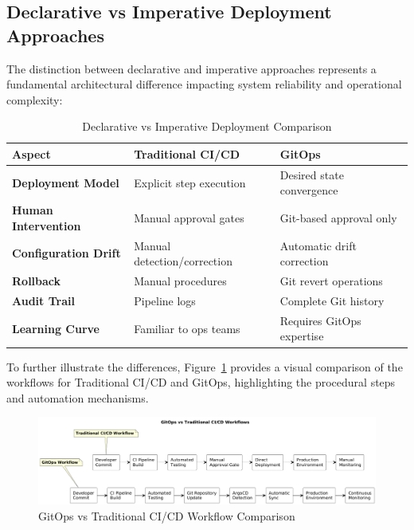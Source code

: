 \subsection{Declarative vs Imperative Deployment Approaches}

The distinction between declarative and imperative approaches represents a fundamental architectural difference impacting system reliability and operational complexity:

\begin{table}[h]
\centering
\caption{Declarative vs Imperative Deployment Comparison}
\label{tab:declarative_imperative_comparison}
\renewcommand{\arraystretch}{1.4}
\scriptsize
\begin{tabular}{|p{2.5cm}|p{4.5cm}|p{4.5cm}|}
\hline
\textbf{Aspect} & \textbf{Traditional CI/CD} & \textbf{GitOps} \\
\hline
\textbf{Deployment Model} & Explicit step execution & Desired state convergence \\
\hline
\textbf{Human Intervention} & Manual approval gates & Git-based approval only \\
\hline
\textbf{Configuration Drift} & Manual detection/correction & Automatic drift correction \\
\hline
\textbf{Rollback} & Manual procedures & Git revert operations \\
\hline
\textbf{Audit Trail} & Pipeline logs & Complete Git history \\
\hline
\textbf{Learning Curve} & Familiar to ops teams & Requires GitOps expertise \\
\hline
\end{tabular}
\end{table}

To further illustrate the differences, Figure~\ref{fig:gitops-vs-traditional-cicd} provides a visual comparison of the workflows for Traditional CI/CD and GitOps, highlighting the procedural steps and automation mechanisms.

\begin{figure}[h]
\centering
\includegraphics[width=1.0\textwidth, height=1.8\textheight, keepaspectratio]{figures/GitOp-vs-Traditional-CICD-Workflow-Comparison.png}
\caption{GitOps vs Traditional CI/CD Workflow Comparison}
\label{fig:gitops-vs-traditional-cicd}
\end{figure}

